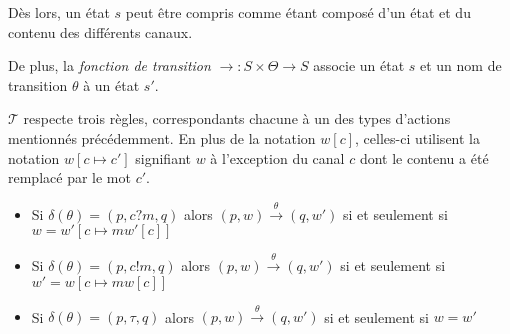 Dès lors, un état $s$ peut être compris comme étant composé d'un état et du contenu des différents canaux.

De plus, la \emph{fonction de transition} $\rightarrow:S\times\Theta\rightarrow S$ associe un état $s$ et un nom de transition $\theta$ à un état $s'$.

$\mathcal{T}$ respecte trois règles, correspondants chacune à un des types d'actions mentionnés précédemment. En plus de la notation $w[c]$, celles-ci utilisent la notation $w[c\mapsto c']$ signifiant $w$ à l'exception du canal $c$ dont le contenu a été remplacé par le mot $c'$.
\begin{itemize}
  \item Si $\delta(\theta)=(p,c?m,q)$ alors $(p,w)\xrightarrow{\theta}(q,w')$ si et seulement si $w=w'[c\mapsto mw'[c]]$
  \item Si $\delta(\theta)=(p,c!m,q)$ alors $(p,w)\xrightarrow{\theta}(q,w')$ si et seulement si $w'=w[c\mapsto mw[c]]$
  \item Si $\delta(\theta)=(p,\tau,q)$ alors $(p,w)\xrightarrow{\theta}(q,w')$ si et seulement si $w=w'$
\end{itemize}




